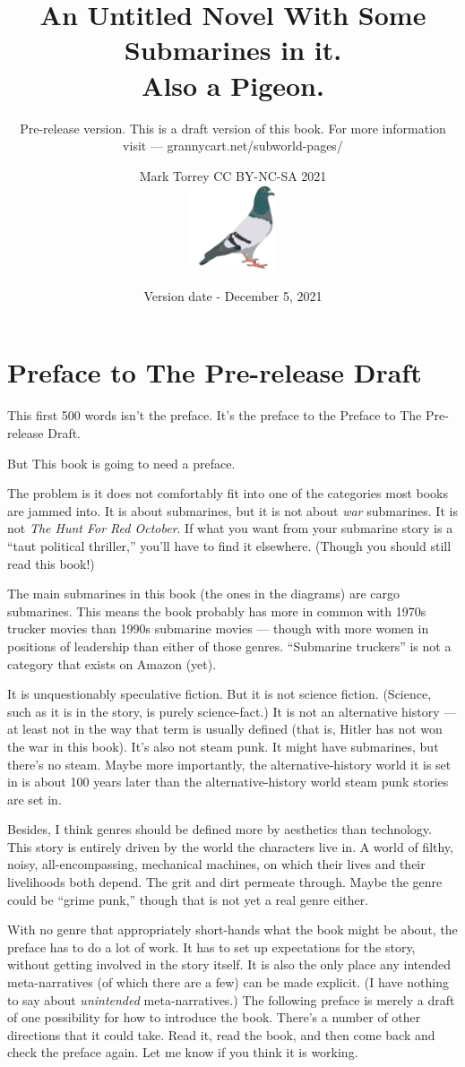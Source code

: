 \documentclass[
]{scrbook}
\title{An Untitled Novel With Some Submarines in it.\\ Also a Pigeon.}
\subtitle{Pre-release version. This is a draft version of this book. For
more information visit --- grannycart.net/subworld-pages/}
\author{Mark Torrey CC BY-NC-SA 2021\\[5mm] \includegraphics[width=1in]{../cover/pigeon-logo.png}}
\date{Version date - December 5, 2021}
\begin{document}
\frontmatter
\maketitle

\small
\mainmatter
\hypertarget{preface-to-the-pre-release-draft}{%
\chapter*{Preface to The Pre-release
Draft}\label{preface-to-the-pre-release-draft}}

This first 500 words isn't the preface. It's the preface to the Preface
to The Pre-release Draft.

But This book is going to need a preface.

The problem is it does not comfortably fit into one of the categories
most books are jammed into. It is about submarines, but it is not about
\emph{war} submarines. It is not \emph{The Hunt For Red October}. If
what you want from your submarine story is a ``taut political
thriller,'' you'll have to find it elsewhere. (Though you should still
read this book!)

The main submarines in this book (the ones in the diagrams) are cargo
submarines. This means the book probably has more in common with 1970s
trucker movies than 1990s submarine movies --- though with more women in
positions of leadership than either of those genres. ``Submarine
truckers'' is not a category that exists on Amazon (yet).

It is unquestionably speculative fiction. But it is not science fiction.
(Science, such as it is in the story, is purely science-fact.) It is not
an alternative history --- at least not in the way that term is usually
defined (that is, Hitler has not won the war in this book). It's also
not steam punk. It might have submarines, but there's no steam. Maybe
more importantly, the alternative-history world it is set in is about
100 years later than the alternative-history world steam punk stories
are set in.

Besides, I think genres should be defined more by aesthetics than
technology. This story is entirely driven by the world the characters
live in. A world of filthy, noisy, all-encompassing, mechanical
machines, on which their lives and their livelihoods both depend. The
grit and dirt permeate through. Maybe the genre could be ``grime punk,''
though that is not yet a real genre either.

With no genre that appropriately short-hands what the book might be
about, the preface has to do a lot of work. It has to set up
expectations for the story, without getting involved in the story
itself. It is also the only place any intended meta-narratives (of which
there are a few) can be made explicit. (I have nothing to say about
\emph{unintended} meta-narratives.) The following preface is merely a
draft of one possibility for how to introduce the book. There's a number
of other directions that it could take. Read it, read the book, and then
come back and check the preface again. Let me know if you think it is
working.
\end{document}
